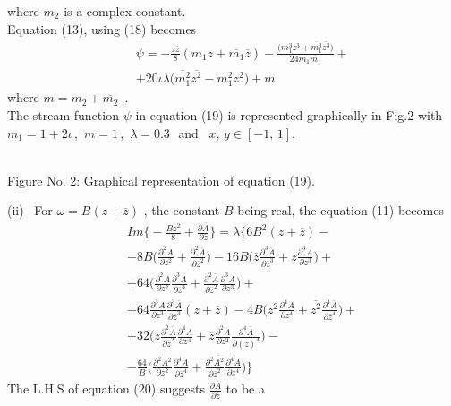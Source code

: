\documentclass[twocolumn,showpacs,preprintnumbers,amsmath,amssymb]{revtex4}
\newcommand{\bea}{\begin{eqnarray}}
\newcommand{\eea}{\end{eqnarray}}
\begin{document}
where $m_{2}$  is a complex constant.\\Equation (13), using (18)
becomes \bea\nonumber&&
\psi=-\frac{z\overline{z}}{8}(m_{1}z+\overline{m_{1}}\overline{z})-\frac{\Big(m^{3}_1z^{3}
+\overline{m^{3}_1}\overline{z^{3}}\Big)}{24m_{1}\overline{m_{1}}}+\\&&+20\iota\lambda\Big
(\overline{m^{2}_1}\overline{z^{2}}-m^{2}_1z^{2}\Big)+m \eea where
$m = m_2 + \overline{m_2}$\, .\\ The stream function $\psi$ in
equation (19) is represented graphically in Fig.2 with $m_1 = 1 +
2\iota\, ,\,\, m = 1\, ,\,\, \lambda = 0.3 $\,\, and \, $x ,\, y \in
[-1 ,\,1]$.
\begin{center}
\\Figure No. 2: Graphical
representation of equation (19).
\end{center}
(ii)\,\,\,  For $\omega=B(z+\overline{z})$ , the constant $B$  being
real, the equation (11) becomes \bea\nonumber &&
Im\Big\{-\frac{Bz^2}{8}+\frac{\partial\overline{A}}{\partial\overline{z}}\Big\}
=\lambda\Big\{6B^{2}(z+\overline{z})-
\\&&\nonumber-8B\Big(\frac{\partial^{2}A}{\partial
z^{2}}+\frac{\partial^{2}\overline{A}}{\partial\overline{z}^{2}}\Big)
-16B\Big(\overline{z}\frac{\partial^{3}\overline{A}}{\partial
\overline{z}^{3}}+z\frac{\partial^{3}A}{\partial z^{3}}\Big)+
\\&&\nonumber+64\Big(\frac{\partial^{2}A}{\partial
z^{2}}\frac{\partial^{3}\overline{A}}{\partial\overline{z}^{3}}
+\frac{\partial^{2}\overline{A}}{\partial\overline{z}^{2}}\frac{\partial^{3}A}{\partial
z^{3}} \Big)+\\&&\nonumber+64\frac{\partial^{3}A}{\partial z^{3}}
\frac{\partial^{3}\overline{A}}{\partial\overline{z}^{3}}(z+\overline{z})-4B\Big(z^{2}
\frac{\partial^{4}A}{\partial
z^{4}}+\overline{z^{2}}\frac{\partial^{4}\overline{A}}{\partial\overline{z}^{4}}\Big)
+\\&&+32\Big(z\frac{\partial^{2}\overline{A}}{\partial\overline{z}^{2}}
\frac{\partial^{4}A}{\partial
z^{4}}+\overline{z}\frac{\partial^{2}A}{\partial
z^{2}}\frac{\partial^{4}\overline{A}}{\partial(\overline{z})^{4}}\Big)-\\&&\nonumber-
\frac{64}{B}\Big(\frac{\partial^{2}A^{2}}{\partial
z^{2}}\frac{\partial^{4}\overline{A}}{\partial\overline{z}^{4}}
+\frac{\partial^{2}\overline{A^{2}}}{\partial\overline{z}^{2}}\frac{\partial^{4}A}{\partial
z^{4}}\Big)\Big\}\eea The L.H.S of equation (20) suggests
$\frac{\partial \overline{A}}{\partial\overline{z}}$ to be a
\end{document}
